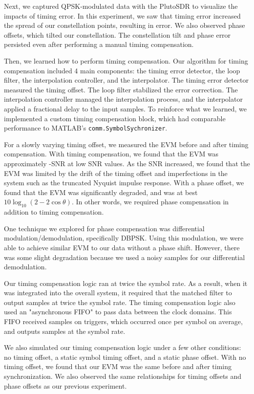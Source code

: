 \documentclass{article}
\begin{document}
Next, we captured QPSK-modulated data with the PlutoSDR to visualize the impacts of timing error. In this experiment, we saw that timing error increased the spread of our constellation points, resulting in error. We also observed phase offsets, which tilted our constellation. The constellation tilt and phase error persisted even after performing a manual timing compensation.

Then, we learned how to perform timing compensation. Our algorithm for timing compensation included 4 main components: the timing error detector, the loop filter, the interpolation controller, and the interpolator. The timing error detector measured the timing offset. The loop filter stabilized the error correction. The interpolation controller managed the interpolation process, and the interpolator applied a fractional delay to the input samples. To reinforce what we learned, we implemented a custom timing compensation block, which had comparable performance to MATLAB's \texttt{comm.SymbolSychronizer}.

For a slowly varying timing offset, we measured the EVM before and after timing compensation. With timing compensation, we found that the EVM was approximately -SNR at low SNR values. As the SNR increased, we found that the EVM was limited by the drift of the timing offset and imperfections in the system such as the truncated Nyquist impulse response. With a phase offset, we found that the EVM was significantly degraded, and was at best $10\log_{10}(2 - 2\cos\theta)$. In other words, we required phase compensation in addition to timing compensation.

One technique we explored for phase compensation was differential modulation/demodulation, specifically DBPSK. Using this modulation, we were able to achieve similar EVM to our data without a phase shift. However, there was some slight degradation because we used a noisy samples for our differential demodulation.

Our timing compensation logic ran at twice the symbol rate. As a result, when it was integrated into the overall system, it required that the matched filter to output samples at twice the symbol rate. The timing compensation logic also used an "asynchronous FIFO" to pass data between the clock domains. This FIFO received samples on triggers, which occurred once per symbol on average, and outputs samples at the symbol rate.

We also simulated our timing compensation logic under a few other conditions: no timing offset, a static symbol timing offset, and a static phase offset. With no timing offset, we found that our EVM was the same before and after timing synchronization. We also observed the same relationships for timing offsets and phase offsets as our previous experiment.
\end{document}

